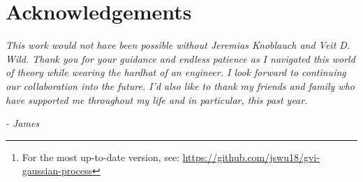 \documentclass{article}
\numberwithin{equation}{section}
\begin{document}

\begin{abstract}
Proposed by \cite{knoblauch2022optimization}, generalised variational inference (GVI) is a learning framework motivated by an optimisation-centric interpretation of Bayesian inference. 
Extending GVI to infinite dimensions, \cite{wild2022generalized} introduces Gaussian Wasserstein inference (GWI) in function spaces. 
GWI demonstrates a new inference approach for variational Gaussian processes (GPs), circumventing many limitations of previous approaches.
Our work introduces various improvements to GWI for GPs, including new kernel parameterisations such as the neural network GP (NNGP) kernels from \cite{novak2019neural}. We also introduce a new learning framework that we call projected GVI (pGVI) for GPs. 
pGVI weakens the GVI assumption of a definite regulariser.
Instead, we propose regularising between scalar projections of the stochastic processes, an approach we call projected regularisation.
We demonstrate that pGVI is a highly flexible and well-performing variational inference framework with significantly cheaper linearly time computational costs compared to the cubic costs of existing approaches.
We also present our learning frameworks through a comprehensive software implementation available on 
\href{https://github.com/jswu18/gvi-gaussian-process}{GitHub}\footnote{For the most up-to-date version, see: \href{https://github.com/jswu18/gvi-gaussian-process}{https://github.com/jswu18/gvi-gaussian-process}}.
\end{abstract}

\newpage
\section*{Acknowledgements}
\textit{This work would not have been possible without Jeremias Knoblauch and Veit D. Wild. 
Thank you for your guidance and endless patience as I navigated this world of theory while wearing the hardhat of an engineer. 
I look forward to continuing our collaboration into the future.
I’d also like to thank my friends and family who have supported me throughout my life and in particular, this past year. 
}

\hspace*{\fill} \textit{- James}

\newpage
\tableofcontents
\newpage
{}
\setcounter{page}{1}
\setcounter{section}{-1}
\end{document}
